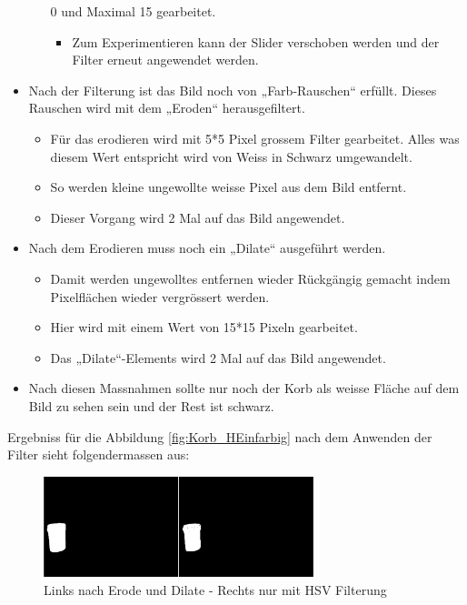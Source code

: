 \begin{itemize}
\begin{itemize}
            0 und Maximal 15 gearbeitet.
        \begin{itemize}
            \item Zum Experimentieren kann der Slider verschoben werden und 
                der Filter erneut angewendet werden.
        \end{itemize}
    \end{itemize}
    \item Nach der Filterung ist das Bild noch von „Farb-Rauschen“ erfüllt. 
        Dieses Rauschen wird mit dem „Eroden“ herausgefiltert.
    \begin{itemize}
        \item Für das erodieren wird mit 5*5 Pixel grossem Filter gearbeitet. 
            Alles was diesem Wert entspricht wird von Weiss in Schwarz 
            umgewandelt.
        \item So werden kleine ungewollte weisse Pixel aus dem Bild entfernt.
        \item Dieser Vorgang wird 2 Mal auf das Bild angewendet.
    \end{itemize}
    \item Nach dem Erodieren muss noch ein „Dilate“ ausgeführt werden.
    \begin{itemize}
        \item Damit werden ungewolltes entfernen wieder Rückgängig gemacht 
            indem Pixelflächen wieder vergrössert werden.
        \item Hier wird mit einem Wert von 15*15 Pixeln gearbeitet.
        \item Das „Dilate“-Elements wird 2 Mal auf das Bild angewendet.
    \end{itemize}
    \item Nach diesen Massnahmen sollte nur noch der Korb als weisse Fläche 
        auf dem Bild zu sehen sein und der Rest ist schwarz.
\end{itemize}

Ergebniss für die Abbildung \ref{fig:Korb_HEinfarbig} nach dem Anwenden der 
Filter sieht folgendermassen aus:

\begin{figure}[h!]
    \centering
    \includegraphics[width=0.7\textwidth]{fig/Korberkennung1.png}
    \caption{Links nach Erode und Dilate - Rechts nur mit HSV Filterung}
    \label{fig:Korb_Erkennung}
\end{figure}

